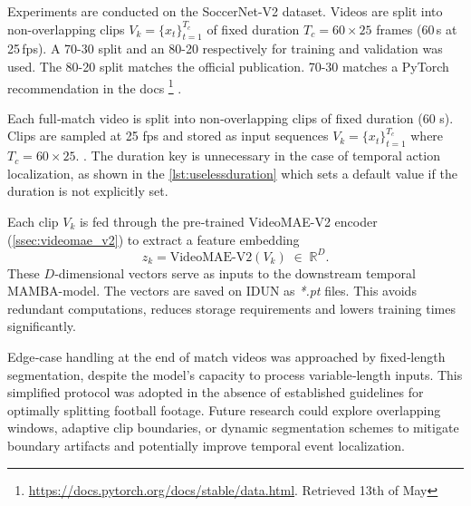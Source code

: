 Experiments are conducted on the SoccerNet-V2 dataset\cite{deliege_soccernet-v2_dataset_2021}. Videos are split into non-overlapping clips $V_k=\{x_t\}_{t=1}^{T_c}$ of fixed duration $T_c=60\!\times\!25$ frames (60\,s at 25\,fps). A 70-30 split and an 80-20 respectively for training and validation was used. The 80-20 split matches the official publication. 70-30 matches a PyTorch recommendation in the docs
\footnote{
\url{https://docs.pytorch.org/docs/stable/data.html}. 
Retrieved 13th of May}
.






Each full‐match video is split into non‐overlapping clips of fixed duration (60 s). Clips are sampled at 25 fps and stored as input sequences $V_k=\{x_t\}_{t=1}^{T_c}$ where $T_c=60\times25$. . The duration key is unnecessary in the case of temporal action localization, as shown in the \autoref{lst:uselessduration} which sets a default value if the duration is not explicitly set. 



Each clip $V_k$ is fed through the pre‐trained VideoMAE-V2 encoder (\autoref{ssec:videomae_v2}) to extract a feature embedding
\[
z_k = \mathrm{VideoMAE\text{-}V2}(V_k)\;\in\;\mathbb{R}^D.
\]
These $D$‐dimensional vectors serve as inputs to the downstream  temporal MAMBA-model. The vectors are saved on IDUN as \textit{*.pt} files. This avoids redundant computations, reduces storage requirements and lowers training times significantly. 

Edge‐case handling at the end of match videos was approached by fixed‐length segmentation, despite the model’s capacity to process variable‐length inputs. This simplified protocol was adopted in the absence of established guidelines for optimally splitting football footage.  Future research could explore overlapping windows, adaptive clip boundaries, or dynamic segmentation schemes to mitigate boundary artifacts and potentially improve temporal event localization. 

